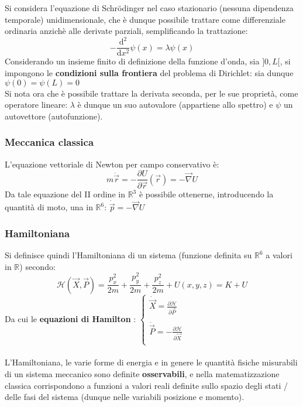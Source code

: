 \documentclass[10pt, oneside]{book}
\theoremstyle{plain}
\begin{document}
Si considera l'equazione di Schr\"odinger nel caso stazionario (nessuna dipendenza temporale) unidimensionale, che è dunque possibile trattare come differenziale ordinaria anzichè alle derivate parziali, semplificando la trattazione:
\[- \frac{\textrm{d}^2}{\textrm{d}x^2}\psi(x) = \lambda \psi(x)\]
Considerando un insieme finito di definizione della funzione d'onda, sia $]0, L[$, si impongono le \textbf{condizioni sulla frontiera} del problema di Dirichlet: sia dunque $\psi(0) = \psi(L) = 0$
\\Si nota ora che è possibile trattare la derivata seconda, per le sue proprietà, come operatore lineare: $\lambda$ è dunque un suo autovalore (appartiene allo spettro) e $\psi$ un autovettore (autofunzione).

\subsubsection*{Meccanica classica}
L'equazione vettoriale di Newton per campo conservativo è:
\[m \ddot{\Vec{r}} = - \frac{\partial U}{\partial \Vec{r}}(\Vec{r}) = - \Vec{\nabla} U\]
Da tale equazione del II ordine in $\mathbb{R}^3$ è possibile ottenerne, introducendo la quantità di moto, una in $\mathbb{R}^6$: $\displaystyle \dot{\Vec{p}} = - \Vec{\nabla} U$

\subsubsection*{Hamiltoniana}
Si definisce quindi l'Hamiltoniana di un sistema (funzione definita su $\mathbb{R}^6$ a valori in $\mathbb{R}$) secondo:
\[\mathcal{H} (\Vec{X}, \Vec{P}) = \frac{p_x^2}{2m} +  \frac{p_y^2}{2m} +  \frac{p_z^2}{2m} + U(x,y,z) = K + U\]
Da cui le \textbf{equazioni di Hamilton} : $\displaystyle \begin{cases}
\displaystyle \dot{\Vec{X}} = \frac{\partial \mathcal{H}}{\partial \Vec{P}}\\
\\
   \displaystyle \dot{\Vec{P}} = - \frac{\partial \mathcal{H}}{\partial \Vec{X}}\\ 
\end{cases}$
\\~\\L'Hamiltoniana, le varie forme di energia e in genere le quantità fisiche misurabili di un sistema meccanico sono definite \textbf{osservabili}, e nella matematizzazione classica corrispondono a funzioni a valori reali definite sullo spazio degli stati / delle fasi del sistema (dunque nelle variabili posizione e momento).
\end{document}
